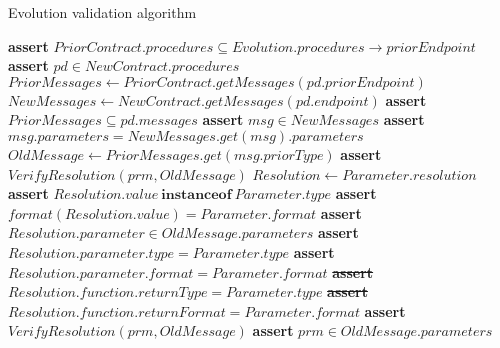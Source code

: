 \begin{algorithm}
    \caption{Evolution validation algorithm}\label{alg:evoalg}
    \begin{algorithmic}[1]
            \State \textbf{assert} $PriorContract.procedures \subseteq Evolution.procedures\rightarrow priorEndpoint$
                \State \textbf{assert} $pd \in NewContract.procedures$
                \State $PriorMessages \leftarrow PriorContract.getMessages(pd.priorEndpoint)$
                \State $NewMessages \leftarrow NewContract.getMessages(pd.endpoint)$
                \State \textbf{assert} $PriorMessages \subseteq pd.messages$
                    \State \textbf{assert} $msg \in NewMessages$
                    \State \textbf{assert} $msg.parameters = NewMessages.get(msg).parameters$
                        \State $OldMessage \leftarrow PriorMessages.get(msg.priorType)$
                        \State \textbf{assert} $VerifyResolution(prm, OldMessage)$
                    \EndFor
                \EndFor
            \EndFor
        \EndProcedure
        \Statex
            \State $Resolution \leftarrow Parameter.resolution$
                \State \textbf{assert} $Resolution.value\ \textbf{instanceof}\ Parameter.type$
                \State \textbf{assert} $format(Resolution.value) = Parameter.format$
                \State \textbf{assert} $Resolution.parameter \in OldMessage.parameters$
                \State \textbf{assert} $Resolution.parameter.type = Parameter.type$
                \State \textbf{assert} $Resolution.parameter.format = Parameter.format$
                \State \st{\textbf{assert} $Resolution.function.returnType = Parameter.type$}
                \State \st{\textbf{assert} $Resolution.function.returnFormat = Parameter.format$}
                        \State \textbf{assert} $VerifyResolution(prm, OldMessage)$
                    \Else
                        \State \textbf{assert} $prm \in OldMessage.parameters$
                    \EndIf
                \EndFor
            \EndIf
        \EndProcedure
    \end{algorithmic}
\end{algorithm}

